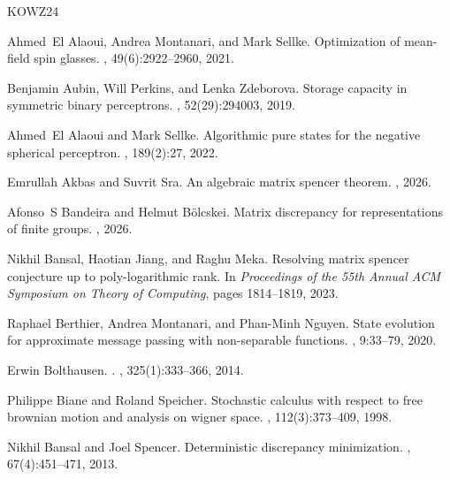 \documentclass[11pt]{article}
\theoremstyle{definition}
\theoremstyle{remark}
\numberwithin{equation}{section}
\numberwithin{theorem}{section}
\begin{document}

\begin{thebibliography}{KOWZ24}

Ahmed~El Alaoui, Andrea Montanari, and Mark Sellke.
\newblock Optimization of mean-field spin glasses.
, 49(6):2922--2960, 2021.

Benjamin Aubin, Will Perkins, and Lenka Zdeborova.
\newblock Storage capacity in symmetric binary perceptrons.
, 52(29):294003, 2019.

Ahmed~El Alaoui and Mark Sellke.
\newblock Algorithmic pure states for the negative spherical perceptron.
, 189(2):27, 2022.

Emrullah Akbas and Suvrit Sra.
\newblock An algebraic matrix spencer theorem.
, 2026.

Afonso~S Bandeira and Helmut B{\"o}lcskei.
\newblock Matrix discrepancy for representations of finite groups.
, 2026.

Nikhil Bansal, Haotian Jiang, and Raghu Meka.
\newblock Resolving matrix spencer conjecture up to poly-logarithmic rank.
\newblock In {\em Proceedings of the 55th Annual ACM Symposium on Theory of Computing}, pages 1814--1819, 2023.

Raphael Berthier, Andrea Montanari, and Phan-Minh Nguyen.
\newblock State evolution for approximate message passing with non-separable functions.
, 9:33--79, 2020.

Erwin Bolthausen.
.
, 325(1):333--366, 2014.

Philippe Biane and Roland Speicher.
\newblock Stochastic calculus with respect to free brownian motion and analysis on wigner space.
, 112(3):373--409, 1998.

Nikhil Bansal and Joel Spencer.
\newblock Deterministic discrepancy minimization.
, 67(4):451--471, 2013.


\end{thebibliography}
\end{document}

